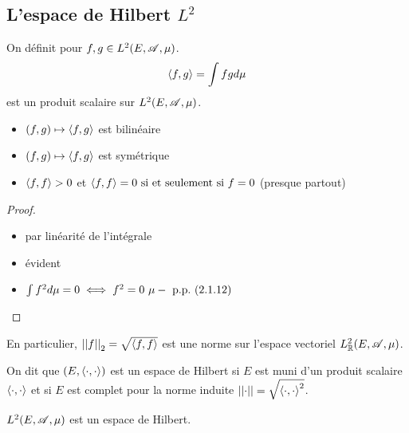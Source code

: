 \subsection{L'espace de Hilbert $L^2$}

\begin{definition}
	On définit pour $f,g \in L^2(E,\mathscr{A}, \mu)$.
	$$\left\langle f, g \right\rangle = \int fg d \mu$$
	est un produit scalaire sur $L^2(E, \mathscr{A}, \mu)$.
	\begin{itemize}
		\item $(f,g) \mapsto \left\langle f, g \right\rangle$ est bilinéaire
		\item $(f,g) \mapsto \left\langle f, g \right\rangle$ est symétrique
		\item $\left\langle f, f \right\rangle > 0$ et $\left\langle f, f \right\rangle = 0 \text{ si et seulement si } f = 0$ (presque partout)
	\end{itemize}
\end{definition}


\begin{proof}
	\begin{itemize}
		\item par linéarité de l'intégrale
		\item évident
		\item $ \int f^2 d \mu = 0 \iff f^2 = 0 \ \mupp \ (2.1.12)$
	\end{itemize}
\end{proof}


\begin{remarque}
	En particulier, $\left|\left|f\right|\right|_2 = \sqrt{\left\langle f, f \right\rangle}$ est une norme sur l'espace vectoriel $L^2_{\mathbb{R}}(E, \mathscr{A}, \mu)$.
\end{remarque}

\begin{definition}
	On dit que $(E, \left\langle \cdot, \cdot \right\rangle)$  est un espace de Hilbert si $E$ est muni d'un produit scalaire $\left\langle \cdot, \cdot \right\rangle$ et
	si $E$ est complet pour la norme induite $\left|\left|\cdot\right|\right| = \sqrt{\left\langle \cdot, \cdot \right\rangle^2}$.
\end{definition}

\begin{theorem}[Riesz]
	$L^2(E, \mathscr{A}, \mu)$ est un espace de Hilbert.
\end{theorem}

